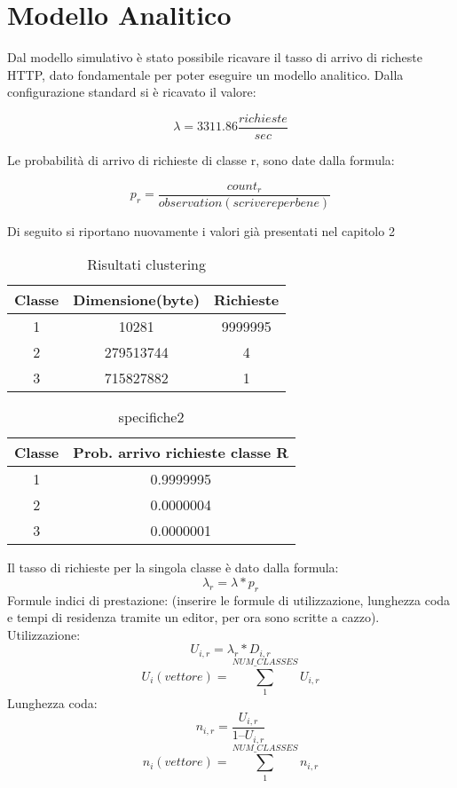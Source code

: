 \chapter{Modello Analitico}
Dal modello simulativo è stato possibile ricavare il tasso di arrivo di richeste HTTP, dato fondamentale per poter eseguire un modello analitico. Dalla configurazione standard si è ricavato il valore: 

$$\lambda =  3311.86 \frac{richieste}{sec}$$

Le probabilità di arrivo di richieste di classe r, sono date dalla formula:

$$p_{r} = \frac{count_{r}}{observation (scrivere per bene)}$$

Di seguito si riportano nuovamente i valori già presentati nel capitolo 2
\begin{table}[htbp]
\begin{center}
\begin{tabular}{||c|c|c||}
\hline
Classe	&Dimensione(byte)		&Richieste \\ 
\hline\hline
1 &10281 &9999995\\ \hline
2 &279513744 &4 \\ \hline
3 &715827882 &1 \\ \hline
\end{tabular}
\end{center}
\caption{Risultati clustering}
\label{risclustering}
\end{table}
\begin{table}[H]
\begin{center}
\begin{tabular}{||c|c||}
\hline
Classe		&Prob. arrivo richieste classe R	\\
\hline
\hline
1		&0.9999995	\\
\hline
2		&0.0000004\\
\hline
3		&0.0000001\\
\hline
\end{tabular}
\end{center}
\caption{specifiche2}
\label{test_2}
\end{table}
Il tasso di richieste per la singola classe è dato dalla formula: 
$$
\lambda_{r} = \lambda*p_{r}
$$
Formule indici di prestazione:
(inserire le formule di utilizzazione, lunghezza coda e tempi di residenza tramite un editor, per ora sono scritte a cazzo).
Utilizzazione:
$$U_{i,r} = \lambda_{r} * D_{i,r}$$
$$U_{i} (vettore)  = \sum_{1}^{NUM\_CLASSES} U_{i,r}$$
Lunghezza coda:
$$n_{i,r} = \frac{U_{i,r}}{1 – U_{i,r}}$$
$$n_{i} (vettore) = \sum_{1}^{NUM\_CLASSES} n_{i,r}$$
